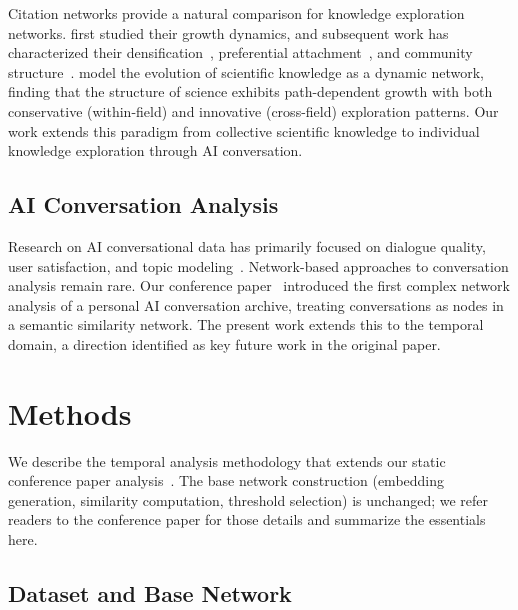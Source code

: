 \documentclass[10pt,letterpaper]{article}
\begin{document}
Citation networks provide a natural comparison for knowledge exploration networks. \citet{price1965networks} first studied their growth dynamics, and subsequent work has characterized their densification~\citep{leskovec2007graph}, preferential attachment~\citep{jeong2003measuring}, and community structure~\citep{chen2010structure}. \citet{shi2015weaving} model the evolution of scientific knowledge as a dynamic network, finding that the structure of science exhibits path-dependent growth with both conservative (within-field) and innovative (cross-field) exploration patterns. Our work extends this paradigm from collective scientific knowledge to individual knowledge exploration through AI conversation.

\subsection{AI Conversation Analysis}

Research on AI conversational data has primarily focused on dialogue quality, user satisfaction, and topic modeling~\citep{serban2016survey}. Network-based approaches to conversation analysis remain rare. Our conference paper~\citep{towell2025cognitive} introduced the first complex network analysis of a personal AI conversation archive, treating conversations as nodes in a semantic similarity network. The present work extends this to the temporal domain, a direction identified as key future work in the original paper.


\section{Methods}
\label{sec:methods}

We describe the temporal analysis methodology that extends our static conference paper analysis~\citep{towell2025cognitive}. The base network construction (embedding generation, similarity computation, threshold selection) is unchanged; we refer readers to the conference paper for those details and summarize the essentials here.

\subsection{Dataset and Base Network}
\label{sec:dataset}
\end{document}

